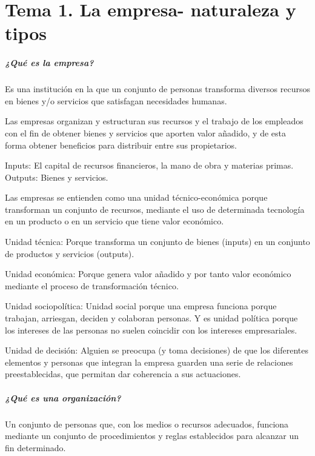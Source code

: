 \documentclass[12pt, twoside, openright]{report} %
\begin{document}






\chapter{Tema 1. La empresa- naturaleza y tipos}

\paragraph{¿Qué es la empresa?} 
Es una institución en la que un conjunto de personas transforma diversos recursos en
bienes y/o servicios que satisfagan necesidades humanas.

Las empresas organizan y estructuran sus recursos y el trabajo de los empleados con el fin de obtener bienes
y servicios que aporten valor añadido, y de esta forma obtener beneficios para distribuir entre sus
propietarios.

Inputs: El capital de recursos financieros, la mano de obra y materias primas. Outputs: Bienes y servicios.

Las empresas se entienden como una unidad técnico-económica porque transforman un conjunto de
recursos, mediante el uso de determinada tecnología en un producto o en un servicio que tiene valor
económico.

Unidad técnica: Porque transforma un conjunto de bienes (inputs) en un conjunto de productos y servicios
(outputs).

Unidad económica: Porque genera valor añadido y por tanto valor económico mediante el proceso de
transformación técnico.

Unidad sociopolítica: Unidad social porque una empresa funciona porque trabajan, arriesgan, deciden y
colaboran personas. Y es unidad política porque los intereses de las personas no suelen coincidir con los
intereses empresariales.

Unidad de decisión: Alguien se preocupa (y toma decisiones) de que los diferentes elementos y personas
que integran la empresa guarden una serie de relaciones preestablecidas, que permitan dar coherencia a sus
actuaciones.

\paragraph{¿Qué es una organización?} 
Un conjunto de personas que, con los medios o recursos adecuados, funciona
mediante un conjunto de procedimientos y reglas establecidos para alcanzar un fin determinado.
\end{document}
